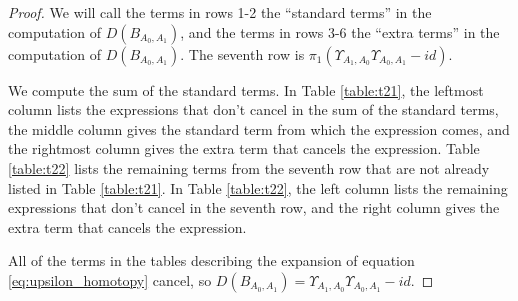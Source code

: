 \begin{proof}
We will call the terms in rows 1-2 the ``standard terms'' in the computation of $D(B_{A_0,A_1})$, and the terms in rows 3-6 the ``extra terms'' in the computation of $D(B_{A_0,A_1})$. The seventh row is $\pi_1(\Upsilon_{A_1,A_0}\Upsilon_{A_0,A_1} - id)$. 

We compute the sum of the standard terms. 
In Table \ref{table:t21}, the leftmost column 
lists the expressions that don't cancel in the 
sum of the standard terms, the middle column 
gives the standard term from which the expression 
comes, and the rightmost column gives the extra 
term that cancels the expression. 
Table \ref{table:t22} lists the remaining terms 
from the seventh row that are not already listed in 
Table \ref{table:t21}. In Table \ref{table:t22}, 
the left column lists the remaining expressions 
that don't cancel in the seventh row, and the 
right column gives the extra term that cancels 
the expression.

All of the terms in the tables describing the 
expansion of equation \ref{eq:upsilon_homotopy} 
cancel, so $D(B_{A_0,A_1}) = \Upsilon_{A_1,A_0}
\Upsilon_{A_0,A_1} - id$.
\end{proof}
%
